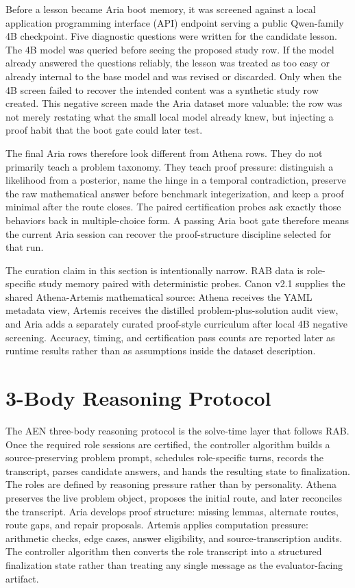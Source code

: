 \documentclass[11pt]{article}
\newcommand{\athena}{Athena}
\newcommand{\aria}{Aria}
\newcommand{\artemis}{Artemis}
\newcommand{\rab}{RAB}
\begin{document}
Before a lesson became Aria boot memory, it was screened against a local application programming interface (API) endpoint serving a public Qwen-family 4B checkpoint. Five diagnostic questions were written for the candidate lesson. The 4B model was queried before seeing the proposed study row. If the model already answered the questions reliably, the lesson was treated as too easy or already internal to the base model and was revised or discarded. Only when the 4B screen failed to recover the intended content was a synthetic study row created. This negative screen made the Aria dataset more valuable: the row was not merely restating what the small local model already knew, but injecting a proof habit that the boot gate could later test.

The final Aria rows therefore look different from Athena rows. They do not primarily teach a problem taxonomy. They teach proof pressure: distinguish a likelihood from a posterior, name the hinge in a temporal contradiction, preserve the raw mathematical answer before benchmark integerization, and keep a proof minimal after the route closes. The paired certification probes ask exactly those behaviors back in multiple-choice form. A passing Aria boot gate therefore means the current Aria session can recover the proof-structure discipline selected for that run.

The curation claim in this section is intentionally narrow. RAB data is role-specific study memory paired with deterministic probes. Canon v2.1 supplies the shared Athena-Artemis mathematical source: Athena receives the YAML metadata view, Artemis receives the distilled problem-plus-solution audit view, and Aria adds a separately curated proof-style curriculum after local 4B negative screening. Accuracy, timing, and certification pass counts are reported later as runtime results rather than as assumptions inside the dataset description.

\section{3-Body Reasoning Protocol}

The AEN three-body reasoning protocol is the solve-time layer that follows \rab{}. Once the required role sessions are certified, the controller algorithm builds a source-preserving problem prompt, schedules role-specific turns, records the transcript, parses candidate answers, and hands the resulting state to finalization. The roles are defined by reasoning pressure rather than by personality. \athena{} preserves the live problem object, proposes the initial route, and later reconciles the transcript. \aria{} develops proof structure: missing lemmas, alternate routes, route gaps, and repair proposals. \artemis{} applies computation pressure: arithmetic checks, edge cases, answer eligibility, and source-transcription audits. The controller algorithm then converts the role transcript into a structured finalization state rather than treating any single message as the evaluator-facing artifact.
\end{document}

